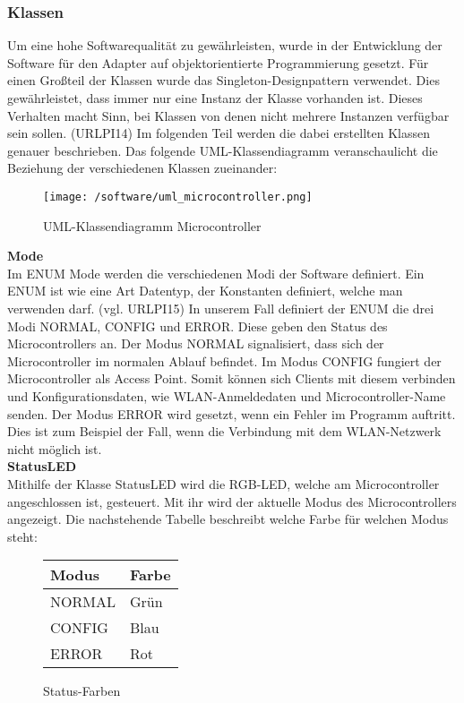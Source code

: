\documentclass[11pt, twoside]{article}
\begin{document}
\subsubsection{Klassen}
Um eine hohe Softwarequalität zu gewährleisten, wurde in der Entwicklung der Software für den Adapter auf objektorientierte Programmierung gesetzt. Für einen Großteil der Klassen wurde das Singleton-Designpattern verwendet. Dies gewährleistet, dass immer nur eine Instanz der Klasse vorhanden ist. Dieses Verhalten macht Sinn, bei Klassen von denen nicht mehrere Instanzen verfügbar sein sollen. (URLPI14) Im folgenden Teil werden die dabei erstellten Klassen genauer beschrieben. Das folgende UML-Klassendiagramm veranschaulicht die Beziehung der verschiedenen Klassen zueinander:
\begin{figure}[H]
\texttt{[image: /software/uml\_microcontroller.png]}
\caption{UML-Klassendiagramm Microcontroller}
\end{figure}
\textbf{Mode} \\
Im ENUM Mode werden die verschiedenen Modi der Software definiert. Ein ENUM ist wie eine Art Datentyp, der Konstanten definiert, welche man verwenden darf. (vgl. URLPI15)  In unserem Fall definiert der ENUM die drei Modi NORMAL, CONFIG und ERROR. Diese geben den Status des Microcontrollers an. Der Modus NORMAL signalisiert, dass sich der Microcontroller im normalen Ablauf befindet. Im Modus CONFIG fungiert der Microcontroller als Access Point. Somit können sich Clients mit diesem verbinden und Konfigurationsdaten, wie WLAN-Anmeldedaten und Microcontroller-Name senden. Der Modus ERROR wird gesetzt, wenn ein Fehler im Programm auftritt. Dies ist zum Beispiel der Fall, wenn die Verbindung mit dem WLAN-Netzwerk nicht möglich ist. \newline \\
\textbf{StatusLED} \\
Mithilfe der Klasse StatusLED wird die RGB-LED, welche am Microcontroller angeschlossen ist, gesteuert. Mit ihr wird der aktuelle Modus des Microcontrollers angezeigt. Die nachstehende Tabelle beschreibt welche Farbe für welchen Modus steht: \newline \\
\begin{figure}[H]
\begin{tabular}{|l|l|}
\hline
\textbf{Modus} & \textbf{Farbe} \\
\hline
NORMAL & Grün \\
\hline
CONFIG & Blau \\
\hline
ERROR & Rot \\
\hline
\end{tabular}
\caption{Status-Farben}
\end{figure}
\end{document}
